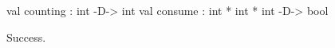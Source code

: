 \runverbatimtrue
{}
\begin{RunVerbatimMsg}
val counting : int -D-> int
val consume : int * int * int -D-> bool
\end{RunVerbatimMsg}
\begin{RunVerbatimErr}
Success.
\end{RunVerbatimErr}
